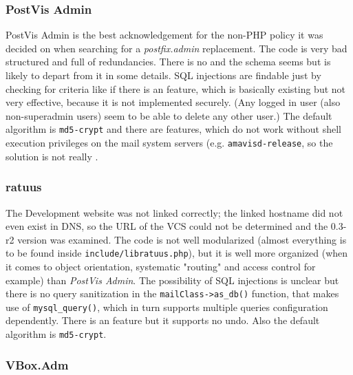 \documentclass[12pt,a4paper]{scrartcl}
\begin{document}
			\subsubsection*{PostVis Admin}

				PostVis Admin is the best acknowledgement for the non-PHP
				policy it was decided on when searching for a
				\emph{postfix.admin} replacement. The code is very bad
				structured and full of redundancies. There is no  and the schema seems  but is likely to depart from it in
				some details. \ac{SQL} injections are findable just by checking
				for criteria like if there is an 
				feature, which is basically existing but not very effective,
				because it is not implemented securely. (Any logged in user
				(also non-superadmin users) seem to be able to delete any other
				user.) The default  algorithm is
				\texttt{md5-crypt} and there are features, which do not work
				without shell execution privileges on the mail system servers
				(e.g. \texttt{amavisd-release}, so the solution is not really
				.

			\subsubsection*{ratuus}

				The Development website was not linked correctly; the linked
				hostname did not even exist in DNS, so the URL of the \ac{VCS}
				could not be determined and the 0.3-r2 version was examined.
				The code is not well modularized (almost everything is to be
				found inside \texttt{include/libratuus.php}), but it is well
				more organized (when it comes to object orientation, systematic
				"routing" and access control for example) than \emph{PostVis
				Admin}. The possibility of \ac{SQL} injections is unclear but
				there is no query sanitization in the
				\texttt{mailClass->as\_db()} function, that makes use of
				\texttt{mysql\_query()}, which in turn supports multiple
				queries configuration dependently. There is an  feature but it supports no undo. Also the default
				 algorithm is \texttt{md5-crypt}.

			\subsubsection*{VBox.Adm}
\end{document}
